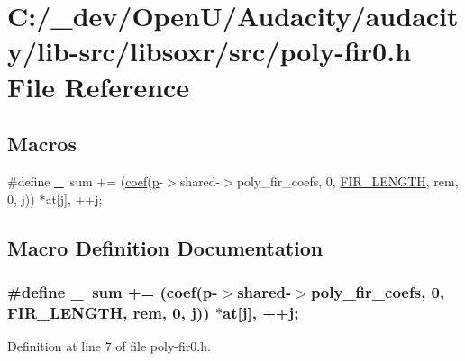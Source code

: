 \hypertarget{poly-fir0_8h}{}\section{C\+:/\+\_\+dev/\+Open\+U/\+Audacity/audacity/lib-\/src/libsoxr/src/poly-\/fir0.h File Reference}
\label{poly-fir0_8h}
\subsection*{Macros}
\begin{DoxyCompactItemize}
\item 
\#define \hyperlink{poly-fir0_8h_ae4dfd7b0d66121016d6466d2ff10e8ba}{\+\_\+}~sum += (\hyperlink{vr32_8c_abb25177205d56e90a9770f6b4c57c07f}{coef}(\hyperlink{xmltok_8h_a94b60f3beb36ae85555d36dc9816769c}{p}-\/$>$shared-\/$>$poly\+\_\+fir\+\_\+coefs, 0, \hyperlink{filters_8h_ab0faf18f9519fa3535f35aa0062247b8}{F\+I\+R\+\_\+\+L\+E\+N\+G\+TH}, rem, 0, j)) $\ast$at\mbox{[}j\mbox{]}, ++j;
\end{DoxyCompactItemize}


\subsection{Macro Definition Documentation}
\subsubsection[{\texorpdfstring{\+\_\+}{_}}]{\setlength{\rightskip}{0pt plus 5cm}\#define \+\_\+~sum += ({\bf coef}({\bf p}-\/$>$shared-\/$>$poly\+\_\+fir\+\_\+coefs, 0, {\bf F\+I\+R\+\_\+\+L\+E\+N\+G\+TH}, rem, 0, j)) $\ast$at\mbox{[}j\mbox{]}, ++j;}\hypertarget{poly-fir0_8h_ae4dfd7b0d66121016d6466d2ff10e8ba}{}\label{poly-fir0_8h_ae4dfd7b0d66121016d6466d2ff10e8ba}


Definition at line 7 of file poly-\/fir0.\+h.

